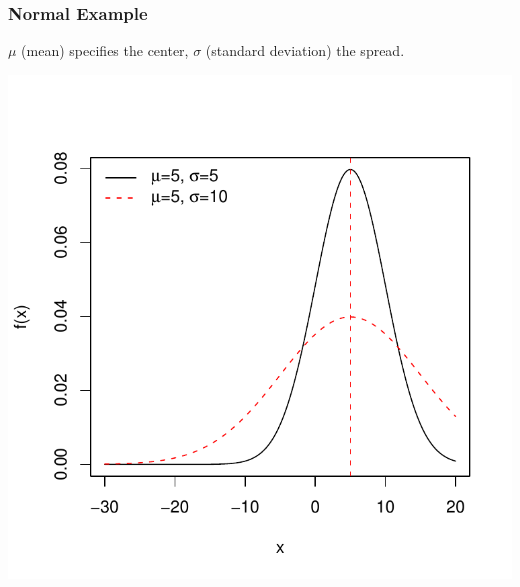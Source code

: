 \documentclass[handout]{beamer}
\begin{document}
\begin{frame}
\frametitle{Normal Example}
$\mu$ (mean) specifies the center, $\sigma$ (standard deviation) the spread.
\begin{center}
\includegraphics{figure/lec02-004}
\end{center}
\end{frame}
\end{document}
